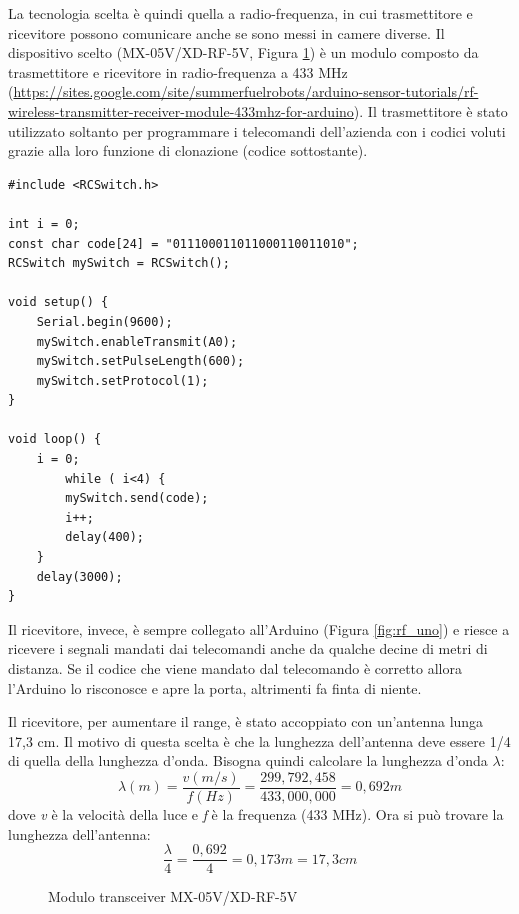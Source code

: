 \documentclass[12pt]{report}
\begin{document}
La tecnologia scelta è quindi quella a radio-frequenza, in cui trasmettitore e ricevitore possono comunicare anche se sono messi in camere diverse. Il dispositivo scelto (MX-05V/XD-RF-5V, Figura \ref{fig:rx_tx_module}) è un modulo composto da trasmettitore e ricevitore in radio-frequenza a 433 MHz (\url{https://sites.google.com/site/summerfuelrobots/arduino-sensor-tutorials/rf-wireless-transmitter-receiver-module-433mhz-for-arduino}). Il trasmettitore è stato utilizzato soltanto per programmare i telecomandi dell'azienda con i codici voluti grazie alla loro funzione di clonazione (codice sottostante).
\begin{lstlisting}
#include <RCSwitch.h>

int i = 0;
const char code[24] = "011100011011000110011010";
RCSwitch mySwitch = RCSwitch();

void setup() {
	Serial.begin(9600);
	mySwitch.enableTransmit(A0);
	mySwitch.setPulseLength(600);
	mySwitch.setProtocol(1);
}

void loop() {
	i = 0;
		while ( i<4) {
		mySwitch.send(code);
		i++;
		delay(400);
	}
	delay(3000);
}
\end{lstlisting}


Il ricevitore, invece, è sempre collegato all'Arduino (Figura \ref{fig:rf_uno}) e riesce a ricevere i segnali mandati dai telecomandi anche da qualche decine di metri di distanza. Se il codice che viene mandato dal telecomando è corretto allora l'Arduino lo risconosce e apre la porta, altrimenti fa finta di niente. 


Il ricevitore, per aumentare il range, è stato accoppiato con un'antenna lunga 17,3 cm. Il motivo di questa scelta è che la lunghezza dell'antenna deve essere 1/4 di quella della lunghezza d'onda. Bisogna quindi calcolare la lunghezza d'onda $\lambda$:
%
\[\lambda(m) = \frac{v(m/s)}{f(Hz)} = \frac{299,792,458}{433,000,000} = 0,692 m\] 
%
dove \textit{v} è la velocità della luce e \textit{f} è la frequenza (433 MHz). Ora si può trovare la lunghezza dell'antenna: 
%
\[\frac{\lambda}{4} = \frac{0,692}{4} = 0,173m = 17,3 cm \]
%

\begin{figure}
	\caption{Modulo transceiver MX-05V/XD-RF-5V}
	\label{fig:rx_tx_module}
\end{figure}
\end{document}
